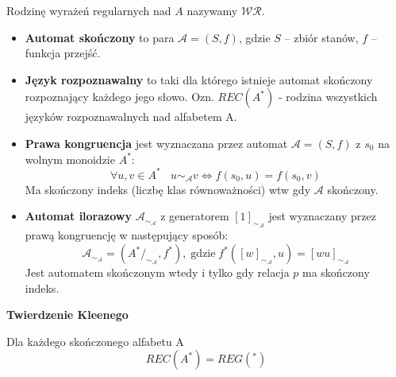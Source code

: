 \documentclass[main.tex]{subfiles}
\begin{document}
    Rodzinę wyrażeń regularnych nad $A$ nazywamy $\mathcal{WR}$.


    \begin{itemize}
        \item \textbf{Automat skończony} to para $\mathcal{A} = (S, f)$, gdzie $S$ -- zbiór stanów, $f$ -- funkcja
        przejść.
        \item \textbf{Język rozpoznawalny} to taki dla którego istnieje automat skończony rozpoznający każdego jego
        słowo. Ozn. $REC(A^*)$ - rodzina wszystkich języków rozpoznawalnych nad alfabetem A.

        \item \textbf{Prawa kongruencja} jest wyznaczana przez automat $\mathcal{A} = (S, f)$ z $s_0$ na wolnym
        monoidzie $A^*$:
        \[\forall u, v \in A^* ~~~~ u \sim_\mathcal{A} v \Leftrightarrow f(s_0, u) = f(s_0, v)\]
        Ma skończony indeks (liczbę klas równoważności) wtw gdy $\mathcal{A}$ skończony.
        \item \textbf{Automat ilorazowy} $\mathcal{A}_{\sim_\mathcal{A}}$ z generatorem $[1]_{\sim_\mathcal{A}}$ jest wyznaczany przez prawą kongruencję
        w następujący sposób:
        \[\mathcal{A}_{\sim_\mathcal{A}} = (A^* /_{\sim_\mathcal{A}}, f^*), \; \mathrm{gdzie} \; f^*([w]_{\sim_\mathcal{A}}, u) = [wu]_{\sim_\mathcal{A}}\]
        Jest automatem skończonym wtedy i tylko gdy relacja $p$ ma skończony indeks.
    \end{itemize}


    \begin{theorem}
        \textbf{Twierdzenie Kleenego}

        Dla każdego skończonego alfabetu A
        \[REC(A^*) = REG(^*)\]
    \end{theorem}
\end{document}
